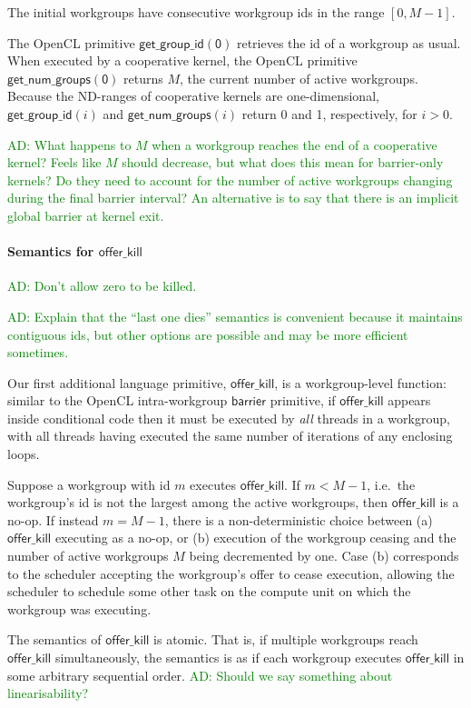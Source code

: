 \documentclass[nocopyrightspace]{sigplanconf-pldi16}
\newcommand{\ADComment}[1]{\textcolor{green}{AD: #1}}
\newcommand{\offerkill}{\mathsf{offer\_kill}}
\newcommand{\getgroupid}[1]{\mathsf{get\_group\_id(#1)}}
\newcommand{\getnumgroups}[1]{\mathsf{get\_num\_groups(#1)}}
\begin{document}
The initial workgroups have consecutive workgroup ids in the range
$[0, M-1]$.

The OpenCL primitive $\getgroupid{0}$ retrieves the id of a
workgroup as usual.  When executed by a cooperative kernel, the OpenCL
primitive $\getnumgroups{0}$ returns $M$, the current number
of active workgroups.  Because the ND-ranges of cooperative kernels
are one-dimensional, $\getgroupid{\mathit{i}}$ and
$\getnumgroups{\mathit{i}}$ return 0 and 1, respectively, for $i >
0$.

\ADComment{What happens to $M$ when a workgroup reaches the end of a
  cooperative kernel?  Feels like $M$ should decrease, but what does
  this mean for barrier-only kernels?  Do they need to account for the
  number of active workgroups changing during the final barrier
  interval?  An alternative is to say that there is an implicit global barrier at kernel exit.}

\paragraph{Semantics for $\offerkill$}

\ADComment{Don't allow zero to be killed.}

\ADComment{Explain that the ``last one dies'' semantics is convenient because it maintains contiguous ids, but other options are possible and may be more efficient sometimes.}

Our first additional language primitive, $\offerkill$, is a
workgroup-level function: similar to the OpenCL intra-workgroup
$\mathsf{barrier}$ primitive, if $\offerkill$ appears inside
conditional code then it must be executed by \emph{all} threads in a
workgroup, with all threads having executed the same number of
iterations of any enclosing loops.

Suppose a workgroup with id $m$ executes $\offerkill$.  If $m < M-1$,
i.e.\ the workgroup's id is not the largest among the active
workgroups, then $\offerkill$ is a no-op.  If instead $m = M-1$, there
is a non-deterministic choice between (a) $\offerkill$ executing as a
no-op, or (b) execution of the workgroup ceasing and the number of
active workgroups $M$ being decremented by one.  Case (b) corresponds
to the scheduler accepting the workgroup's offer to cease execution,
allowing the scheduler to schedule some other task on the compute unit
on which the workgroup was executing.

The semantics of $\offerkill$ is atomic.  That is, if multiple
workgroups reach $\offerkill$ simultaneously, the semantics is as if
each workgroup executes $\offerkill$ in some arbitrary sequential
order.  \ADComment{Should we say something about linearisability?}
\end{document}
